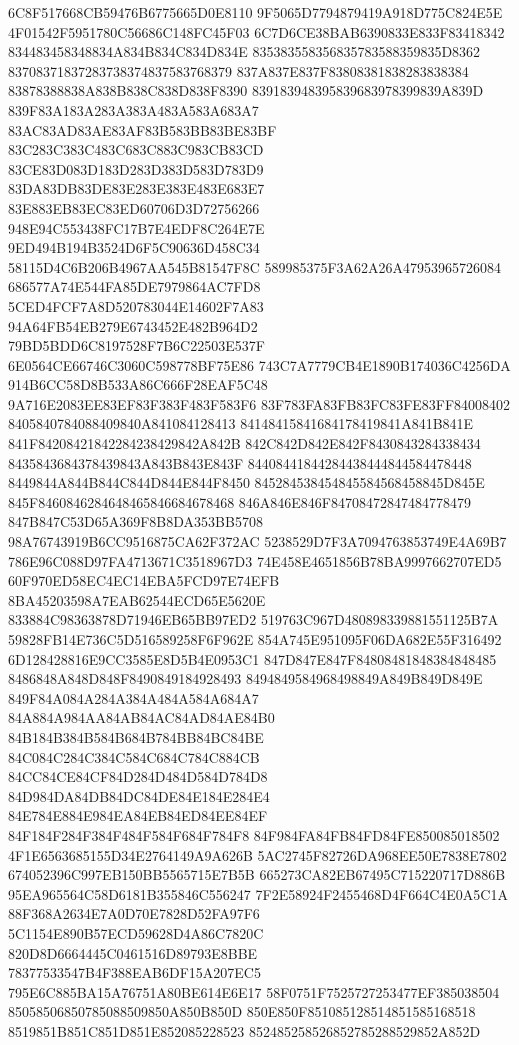 6C8F517668CB59476B6775665D0E8110
9F5065D7794879419A918D775C824E5E
4F01542F5951780C56686C148FC45F03
6C7D6CE38BAB6390833E833F83418342
834483458348834A834B834C834D834E
835383558356835783588359835D8362
83708371837283738374837583768379
837A837E837F83808381838283838384
83878388838A838B838C838D838F8390
839183948395839683978399839A839D
839F83A183A283A383A483A583A683A7
83AC83AD83AE83AF83B583BB83BE83BF
83C283C383C483C683C883C983CB83CD
83CE83D083D183D283D383D583D783D9
83DA83DB83DE83E283E383E483E683E7
83E883EB83EC83ED60706D3D72756266
948E94C553438FC17B7E4EDF8C264E7E
9ED494B194B3524D6F5C90636D458C34
58115D4C6B206B4967AA545B81547F8C
589985375F3A62A26A47953965726084
686577A74E544FA85DE7979864AC7FD8
5CED4FCF7A8D520783044E14602F7A83
94A64FB54EB279E6743452E482B964D2
79BD5BDD6C8197528F7B6C22503E537F
6E0564CE66746C3060C598778BF75E86
743C7A7779CB4E1890B174036C4256DA
914B6CC58D8B533A86C666F28EAF5C48
9A716E2083EE83EF83F383F483F583F6
83F783FA83FB83FC83FE83FF84008402
8405840784088409840A841084128413
84148415841684178419841A841B841E
841F84208421842284238429842A842B
842C842D842E842F8430843284338434
8435843684378439843A843B843E843F
84408441844284438444844584478448
8449844A844B844C844D844E844F8450
845284538454845584568458845D845E
845F8460846284648465846684678468
846A846E846F84708472847484778479
847B847C53D65A369F8B8DA353BB5708
98A76743919B6CC9516875CA62F372AC
5238529D7F3A7094763853749E4A69B7
786E96C088D97FA4713671C3518967D3
74E458E4651856B78BA9997662707ED5
60F970ED58EC4EC14EBA5FCD97E74EFB
8BA45203598A7EAB62544ECD65E5620E
833884C98363878D71946EB65BB97ED2
519763C967D480898339881551125B7A
59828FB14E736C5D516589258F6F962E
854A745E951095F06DA682E55F316492
6D128428816E9CC3585E8D5B4E0953C1
847D847E847F84808481848384848485
8486848A848D848F8490849184928493
8494849584968498849A849B849D849E
849F84A084A284A384A484A584A684A7
84A884A984AA84AB84AC84AD84AE84B0
84B184B384B584B684B784BB84BC84BE
84C084C284C384C584C684C784C884CB
84CC84CE84CF84D284D484D584D784D8
84D984DA84DB84DC84DE84E184E284E4
84E784E884E984EA84EB84ED84EE84EF
84F184F284F384F484F584F684F784F8
84F984FA84FB84FD84FE850085018502
4F1E6563685155D34E2764149A9A626B
5AC2745F82726DA968EE50E7838E7802
674052396C997EB150BB5565715E7B5B
665273CA82EB67495C715220717D886B
95EA965564C58D6181B355846C556247
7F2E58924F2455468D4F664C4E0A5C1A
88F368A2634E7A0D70E7828D52FA97F6
5C1154E890B57ECD59628D4A86C7820C
820D8D6664445C0461516D89793E8BBE
78377533547B4F388EAB6DF15A207EC5
795E6C885BA15A76751A80BE614E6E17
58F0751F7525727253477EF385038504
85058506850785088509850A850B850D
850E850F851085128514851585168518
8519851B851C851D851E852085228523
852485258526852785288529852A852D
